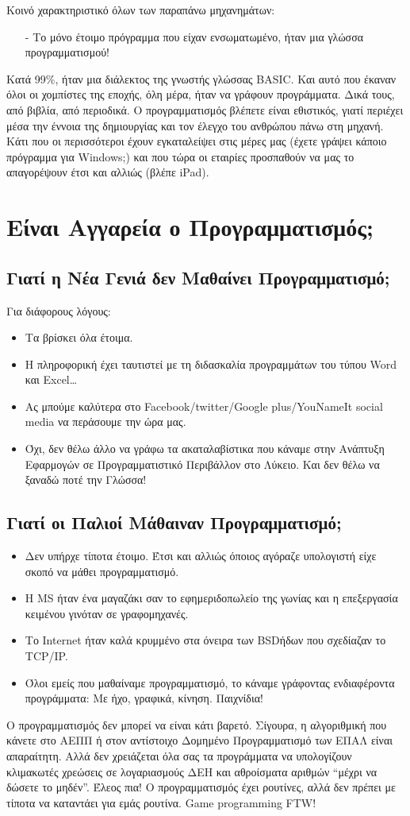 Κοινό χαρακτηριστικό όλων των παραπάνω μηχανημάτων:
%
\begin{itemize}
\item[-] Το μόνο έτοιμο πρόγραμμα που είχαν ενσωματωμένο, ήταν μια γλώσσα
προγραμματισμού!
\end{itemize}
%
Κατά 99\%, ήταν μια διάλεκτος της γνωστής γλώσσας BASIC. Και αυτό που έκαναν
όλοι οι χομπίστες της εποχής, όλη μέρα, ήταν να γράφουν προγράμματα. Δικά
τους, από βιβλία, από περιοδικά. Ο προγραμματισμός βλέπετε είναι εθιστικός,
γιατί περιέχει μέσα την έννοια της δημιουργίας και τον έλεγχο του ανθρώπου
πάνω στη μηχανή. Κάτι που οι περισσότεροι έχουν εγκαταλείψει στις μέρες μας
(έχετε γράψει κάποιο πρόγραμμα για Windows;) και που τώρα οι εταιρίες
προσπαθούν να μας το απαγορέψουν έτσι και αλλιώς (βλέπε iPad).
%
\section{Είναι Αγγαρεία ο Προγραμματισμός;}
%
\subsection{Γιατί η Νέα Γενιά δεν Μαθαίνει Προγραμματισμό;}
%
Για διάφορους λόγους:
%
\begin{itemize}
\item Τα βρίσκει όλα έτοιμα.
\item Η πληροφορική έχει ταυτιστεί με τη διδασκαλία προγραμμάτων του τύπου
Word και Excel\ldots
\item Ας μπούμε καλύτερα στο Facebook/twitter/Google plus/YouNameIt social media να περάσουμε την ώρα μας.
\item Όχι, δεν θέλω άλλο να γράφω τα ακαταλαβίστικα που κάναμε στην Ανάπτυξη Εφαρμογών σε Προγραμματιστικό Περιβάλλον στο Λύκειο. Και δεν θέλω να ξαναδώ ποτέ την Γλώσσα!
\end{itemize}
%
\subsection{Γιατί οι Παλιοί Μάθαιναν Προγραμματισμό;}
%
\begin{itemize}
\item Δεν υπήρχε τίποτα έτοιμο. Έτσι και αλλιώς όποιος αγόραζε υπολογιστή είχε σκοπό να μάθει προγραμματισμό.
\item Η MS ήταν ένα μαγαζάκι σαν το εφημεριδοπωλείο της γωνίας και η επεξεργασία κειμένου γινόταν σε γραφομηχανές.
\item Το Internet ήταν καλά κρυμμένο στα όνειρα των BSDήδων που σχεδίαζαν το TCP/IP.
\item Όλοι εμείς που μαθαίναμε προγραμματισμό, το κάναμε γράφοντας ενδιαφέροντα προγράμματα: Με ήχο, γραφικά, κίνηση. Παιχνίδια!
\end{itemize}
%
Ο προγραμματισμός δεν μπορεί να είναι κάτι βαρετό. Σίγουρα, η αλγοριθμική
που κάνετε στο ΑΕΠΠ ή στον αντίστοιχο Δομημένο Προγραμματισμό των ΕΠΑΛ είναι
απαραίτητη. Αλλά δεν χρειάζεται όλα σας τα προγράμματα να υπολογίζουν
κλιμακωτές χρεώσεις σε λογαριασμούς ΔΕΗ και αθροίσματα αριθμών ``μέχρι να
δώσετε το μηδέν''. Έλεος πια! Ο προγραμματισμός έχει ρουτίνες, αλλά δεν
πρέπει με τίποτα να καταντάει για εμάς ρουτίνα. Game programming FTW!
%
